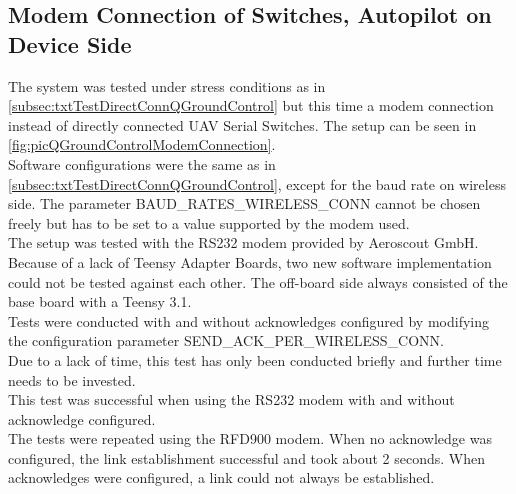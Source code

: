 \subsection{Modem Connection of Switches, Autopilot on Device Side} \label{subsec:txtTestModemtConnQGroundControl}
The system was tested under stress conditions as in \autoref{subsec:txtTestDirectConnQGroundControl} but this time a modem connection instead of directly connected UAV Serial Switches. The setup can be seen in \autoref{fig:picQGroundControlModemConnection}.\\
Software configurations were the same as in \autoref{subsec:txtTestDirectConnQGroundControl}, except for the baud rate on wireless side. The parameter BAUD\_RATES\_WIRELESS\_CONN cannot be chosen freely but has to be set to a value supported by the modem used.\\
The setup was tested with the RS232 modem provided by Aeroscout GmbH.\\
Because of a lack of Teensy Adapter Boards, two new software implementation could not be tested against each other. The off-board side always consisted of the base board with a Teensy 3.1.\\
Tests were conducted with and without acknowledges configured by modifying the configuration parameter SEND\_ACK\_PER\_WIRELESS\_CONN.\\
Due to a lack of time, this test has only been conducted briefly and further time needs to be invested.\\
This test was successful when using the RS232 modem with and without acknowledge configured.\\
The tests were repeated using the RFD900 modem. When no acknowledge was configured, the link establishment successful and took about 2 seconds. When acknowledges were configured, a link could not always be established.\\
%
%
%
%
%
%
%
%
